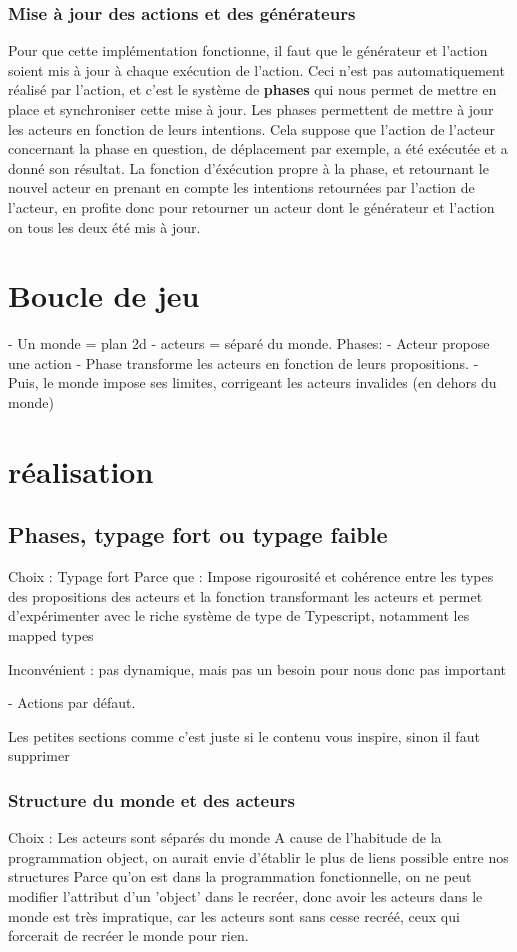 \documentclass{article}
\begin{document}
\subsubsection{Mise à jour des actions et des générateurs}

Pour que cette implémentation fonctionne, il faut que le générateur et l'action soient mis à jour à chaque exécution de l'action. Ceci n'est pas automatiquement réalisé par l'action, et c'est le système de \textbf{phases} qui nous permet de mettre en place et synchroniser cette mise à jour.
Les phases permettent de mettre à jour les acteurs en fonction de leurs intentions. Cela suppose que l'action de l'acteur concernant la phase en question, de déplacement par exemple, a été exécutée et a donné son résultat. La fonction d'éxécution propre à la phase, et retournant le nouvel acteur en prenant en compte les intentions retournées par l'action de l'acteur, en profite donc pour retourner un acteur dont le générateur et l'action on tous les deux été mis à jour.

\section{Boucle de jeu}
- Un monde = plan 2d
- acteurs = séparé du monde.
Phases:
 - Acteur propose une action
 - Phase transforme les acteurs en fonction de leurs propositions.
 - Puis, le monde impose ses limites, corrigeant les acteurs invalides (en dehors du monde)


\section{réalisation}
\subsection{Phases, typage fort ou typage faible}
Choix : Typage fort
Parce que : Impose rigourosité et cohérence entre les types des propositions des 
acteurs et la fonction transformant les acteurs et permet d'expérimenter avec 
le riche système de type de Typescript, notamment les mapped types

Inconvénient : pas dynamique, mais pas un besoin pour nous donc pas important

- Actions par défaut.

Les petites sections comme c'est juste si le contenu vous inspire, sinon il faut supprimer
\subsubsection{Structure du monde et des acteurs}
Choix : Les acteurs sont séparés du monde
A cause de l'habitude de la programmation object, on aurait envie d'établir le plus de liens possible entre nos structures
Parce qu'on est dans la programmation fonctionnelle, on ne peut modifier l'attribut d'un 'object' dans le recréer, 
donc avoir les acteurs dans le monde est très impratique, car les acteurs sont sans cesse recréé, ceux qui forcerait de 
recréer le monde pour rien.
\end{document}
